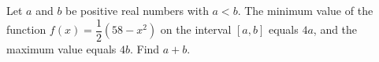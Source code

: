 Let $a$ and $b$ be positive real numbers with $a<b$. The minimum value of the function $f(x)=\dfrac{1}{2}(58-x^{2})$ on the interval $[a,b]$ equals $4a$, and the maximum value equals $4b$. Find $a+b$. 
